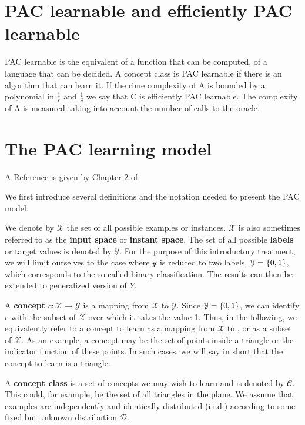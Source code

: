 \section{PAC learnable and efficiently PAC learnable}
PAC learnable is the equivalent of a function that can be computed, of a language that can be decided. A concept class is PAC learnable if there is an algorithm that can learn it. If the rime complexity of A is bounded by a polynomial in \(\frac{1}{\epsilon}\) and \(\frac{1}{\delta}\) we say that C is efficiently PAC learnable. The complexity of A is measured taking into account the number of calls to the oracle.

\section{The PAC learning model}

\begin{note}
	A Reference is given by Chapter 2 of \citet{Mohri2018}

\end{note}

We first introduce several definitions and the notation needed to present the PAC
model.

We denote by $\mathcal{X}$ the set of all possible examples or instances.
$\mathcal{X}$ is also sometimes referred to as the \textbf{input space} or \textbf{instant space}.
The set of all possible \textbf{labels} or target values is denoted by $\mathcal{Y}$.
For the purpose of this introductory treatment, we will limit ourselves to the case where $\mathcal{y}$ is reduced to two labels, $\mathcal{Y} = \{ 0,1 \} $, which corresponds to the so-called binary classification.
The results can then be extended to generalized version of $Y$.

A \textbf{concept} $c: \mathcal{X} \to \mathcal{Y}$ is a mapping from $\mathcal{X}$ to $\mathcal{Y}$.
Since $\mathcal{Y} = \{ 0,1 \} $, we can identify $c$ with the subset of $\mathcal{X}$ over which it takes the value 1.
Thus, in the following, we equivalently refer to a concept to learn as a mapping from $\mathcal{X}$ to \binset, or as a
subset of $\mathcal{X}$.
As an example, a concept may be the set of points inside a triangle
or the indicator function of these points. In such cases, we will say in short that
the concept to learn is a triangle.

A \textbf{concept class} is a set of concepts we may wish to learn and is denoted by $\mathcal{C}$. This could, for example, be the set of all triangles in the plane.
We assume that examples are independently and identically distributed (i.i.d.)
according to some fixed but unknown distribution $\mathcal{D}$.

